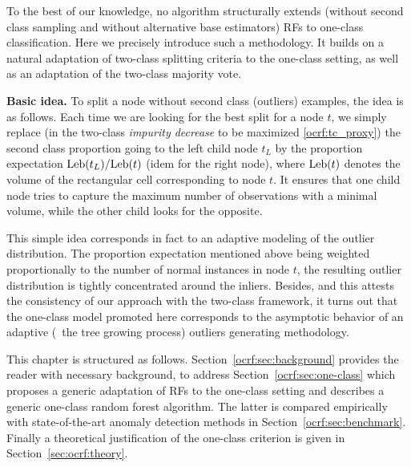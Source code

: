 To the best of our knowledge, no algorithm structurally extends (without second class sampling and without alternative base estimators) RFs to one-class classification. %
Here we precisely %
introduce such a methodology. It builds on a natural adaptation of two-class %
splitting criteria to the one-class setting, as well as an adaptation of the two-class majority vote.

\textbf{Basic idea.} To split a node without second class (outliers) examples, the idea is as follows.
Each time we are looking for the best split for a node $t$, we simply replace (in the two-class \emph{impurity decrease} to be maximized \eqref{ocrf:tc_proxy}) the second class proportion going to the left child node $t_L$ by the proportion expectation $\text{Leb}(t_L)/\text{Leb}(t)$ (idem for the right node), where $\text{Leb}(t)$ denotes the volume of the rectangular cell corresponding to node $t$. 
It ensures that one child node tries to capture the maximum number of observations with a minimal volume, while the other child looks for the opposite. %

This simple idea corresponds in fact to an adaptive modeling of the outlier distribution.
The proportion expectation mentioned above being weighted proportionally to the number of normal instances in node $t$, the resulting outlier distribution is tightly concentrated around the inliers. %
%
Besides, and this attests the consistency of our approach with the two-class framework, it turns out that the one-class model promoted here corresponds to the asymptotic behavior of an adaptive (\wrt~the tree growing process) outliers generating methodology.

This chapter is structured as follows. Section~\ref{ocrf:sec:background} provides the reader with necessary background, to address Section~\ref{ocrf:sec:one-class} which proposes a generic adaptation of RFs to the one-class setting and describes a generic one-class random forest algorithm. The latter is compared empirically with state-of-the-art anomaly detection methods in Section~\ref{ocrf:sec:benchmark}. Finally a theoretical justification of the one-class criterion is given in Section~\ref{sec:ocrf:theory}.
%
